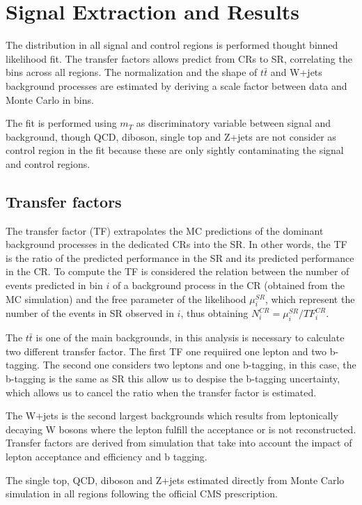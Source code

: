 \section{Signal Extraction and Results}
\label{sec:signal_results}

\noindent The distribution in all signal and control regions is performed thought binned likelihood fit. The transfer factors allows predict from CRs to SR, correlating the bins across all regions. The normalization and the shape of $t\bar{t}$ and W+jets background processes are estimated by deriving a scale factor between data and Monte Carlo in bins. 

The fit is performed using $m_{T}$ as discriminatory variable between signal and background, though QCD, diboson, single top and Z+jets are not consider as control region in the fit because these are only sightly contaminating the signal and control regions. 

\subsection{Transfer factors}

The transfer factor (TF) extrapolates the MC predictions of the dominant background processes in the dedicated CRs into the SR. In other words, the TF is the ratio of the predicted performance in the SR and its predicted performance in the CR. To compute the TF is considered the relation between the number of events predicted in bin $i$ of a background process in the CR (obtained from the MC simulation) and the free parameter of the likelihood $\mu_{i}^{SR}$, which represent the number of the events in SR observed in $i$, thus obtaining $N_{i}^{CR}=\mu_{i}^{SR}/TF^{CR}_{i}$\cite{318}.

The $t\bar{t}$ is one of the main backgrounds, in this analysis is necessary to calculate two different transfer factor. The first TF one requiired one lepton and two b-tagging. The second one considers two leptons and one b-tagging, in this case, the b-tagging is the same as SR this allow us to despise the b-tagging uncertainty, which allows us to cancel the ratio when the transfer factor is estimated.

The W+jets is the second largest backgrounds which results from leptonically decaying W bosons where the lepton fulfill the acceptance or is not reconstructed. Transfer factors are derived from simulation that take into account the impact of lepton acceptance and efficiency and b tagging. 

The single top, QCD, diboson and Z+jets estimated directly from Monte Carlo simulation in all regions following the official CMS prescription. 

\clearpage

